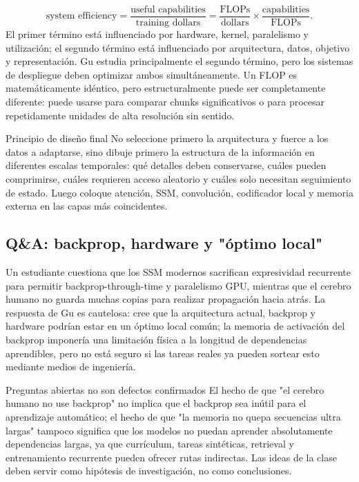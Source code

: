 \documentclass[a4paper]{article}
\begin{document}
\[
\text{system efficiency}
=\frac{\text{useful capabilities}}{\text{training dollars}}
=\frac{\text{FLOPs}}{\text{dollars}}
\times
\frac{\text{capabilities}}{\text{FLOPs}}.
\]
El primer término está influenciado por hardware, kernel, paralelismo y utilización; el segundo término está influenciado por arquitectura, datos, objetivo y representación. Gu estudia principalmente el segundo término, pero los sistemas de despliegue deben optimizar ambos simultáneamente. Un FLOP es matemáticamente idéntico, pero estructuralmente puede ser completamente diferente: puede usarse para comparar chunks significativos o para procesar repetidamente unidades de alta resolución sin sentido.

\begin{importantbox}{Principio de diseño final}
No seleccione primero la arquitectura y fuerce a los datos a adaptarse, sino dibuje primero la estructura de la información en diferentes escalas temporales: qué detalles deben conservarse, cuáles pueden comprimirse, cuáles requieren acceso aleatorio y cuáles solo necesitan seguimiento de estado. Luego coloque atención, SSM, convolución, codificador local y memoria externa en las capas más coincidentes.
\end{importantbox}

\subsection{Q\&A: backprop, hardware y "óptimo local"}

Un estudiante cuestiona que los SSM modernos sacrifican expresividad recurrente para permitir backprop-through-time y paralelismo GPU, mientras que el cerebro humano no guarda muchas copias para realizar propagación hacia atrás. La respuesta de Gu es cautelosa: cree que la arquitectura actual, backprop y hardware podrían estar en un óptimo local común; la memoria de activación del backprop imponería una limitación física a la longitud de dependencias aprendibles, pero no está seguro si las tareas reales ya pueden sortear esto mediante medios de ingeniería.


\begin{warningbox}{Preguntas abiertas no son defectos confirmados}
El hecho de que "el cerebro humano no use backprop" no implica que el backprop sea inútil para el aprendizaje automático; el hecho de que "la memoria no quepa secuencias ultra largas" tampoco significa que los modelos no puedan aprender absolutamente dependencias largas, ya que currículum, tareas sintéticas, retrieval y entrenamiento recurrente pueden ofrecer rutas indirectas. Las ideas de la clase deben servir como hipótesis de investigación, no como conclusiones.
\end{warningbox}
\end{document}

